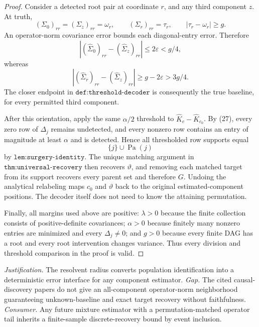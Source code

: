\documentclass{article}
\begin{document}
\begin{proof}
Consider a detected root pair at coordinate \(r\), and any third
component \(z\).  At truth,
\[
 (\Sigma_0)_{rr}=(\Sigma_z)_{rr}=\omega_r,
 \qquad
 (\Sigma_r)_{rr}=\tau_r,
 \qquad |\tau_r-\omega_r|\ge g .
\]
An operator-norm covariance error bounds each diagonal-entry error.
Therefore
\[
 |(\widehat\Sigma_0)_{rr}-(\widehat\Sigma_z)_{rr}|
 \le2\varepsilon<g/4,
\]
whereas
\[
 |(\widehat\Sigma_r)_{rr}-(\widehat\Sigma_z)_{rr}|
 \ge g-2\varepsilon>3g/4.                                         \tag{28}
\]
The closer endpoint in \(\texttt{def:threshold-decoder}\) is consequently
the true baseline, for every permitted third component.

After this orientation, apply the same \(\alpha/2\) threshold to
\(\widehat K_c-\widehat K_{c_0}\).  By (27), every zero row of
\(\Delta_j\) remains undetected, and every nonzero row contains an entry
of magnitude at least \(\alpha\) and is detected.  Hence all thresholded
row supports equal
\[
 \{j\}\cup\operatorname{Pa}(j)
\]
by \(\texttt{lem:surgery-identity}\).  The unique matching argument in
\(\texttt{thm:universal-recovery}\) then recovers \(\vartheta\), and
removing each matched target from its support recovers every parent set
and therefore \(G\).  Undoing the analytical relabeling maps \(c_0\) and
\(\vartheta\) back to the original estimated-component positions.  The
decoder itself does not need to know the attaining permutation.

Finally, all margins used above are positive: \(\lambda>0\) because the
finite collection consists of positive-definite covariances;
\(\alpha>0\) because finitely many nonzero entries are minimized and every
\(\Delta_j\neq0\); and \(g>0\) because every finite DAG has a root and
every root intervention changes variance.  Thus every division and
threshold comparison in the proof is valid.
\end{proof}
\par\smallskip\noindent \textit{Justification.} The resolvent radius converts population identification into a deterministic error interface for any component estimator. \textit{Gap.} The cited causal-discovery papers do not give an all-component operator-norm neighborhood guaranteeing unknown-baseline and exact target recovery without faithfulness. \textit{Consumer.} Any future mixture estimator with a permutation-matched operator tail inherits a finite-sample discrete-recovery bound by event inclusion.
\end{document}
